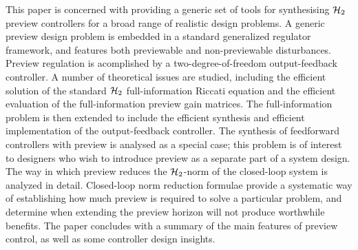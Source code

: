 \label{sec:Abstract}
This paper is concerned with  providing a generic set of tools for synthesising $\mathcal H_2$ preview controllers for a broad range of realistic design problems. A generic preview design problem is 
embedded in a standard generalized regulator framework, and features both previewable and non-previewable disturbances. Preview regulation is acomplished by a two-degree-of-freedom output-feedback controller. A number of theoretical issues are studied, including the efficient solution of the standard $\mathcal H_2$ full-information Riccati equation and the efficient evaluation of the full-information preview gain matrices. The full-information problem is then extended to include the efficient synthesis and efficient implementation of the output-feedback controller.
 The synthesis of feedforward controllers with preview is analysed as a special case; this problem is of interest to designers who wish to introduce preview as a separate part of a system design. The way in which preview reduces the $\mathcal H_2$-norm of the closed-loop system is analyzed in detail.
Closed-loop norm reduction formulae provide a systematic way of establishing how much preview is required to solve a particular problem, and determine when extending the preview horizon will not produce worthwhile benefits. The paper concludes with a summary of the main features of preview control, as well as some controller design insights. 
